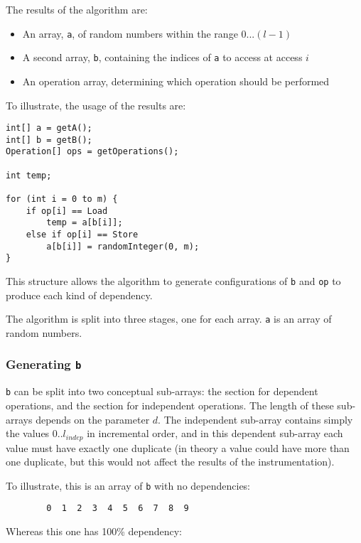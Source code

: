 	The results of the algorithm are:
	
	\begin{itemize}
		\item An array, \texttt{a}, of random numbers within the range $0...(l - 1)$
		\item A second array, \texttt{b}, containing the indices of \texttt{a} to access at access $i$
		\item An operation array, determining which operation should be performed
	\end{itemize}
	
	To illustrate, the usage of the results are:
	
	\begin{lstlisting}
int[] a = getA();
int[] b = getB();
Operation[] ops = getOperations();

int temp;

for (int i = 0 to m) {
    if op[i] == Load
        temp = a[b[i]];
    else if op[i] == Store
        a[b[i]] = randomInteger(0, m);
}\end{lstlisting}

	This structure allows the algorithm to generate configurations of \texttt{b} and \texttt{op} to produce each kind of dependency.
	
	The algorithm is split into three stages, one for each array. \texttt{a} is an array of random numbers.
	
		\subsubsection{Generating \texttt{b}} \label{sec:methodology/params/algo/gen-b}
		\texttt{b} can be split into two conceptual sub-arrays: the section for dependent operations, and the section for independent operations. The length of these sub-arrays depends on the parameter $d$. The independent sub-array contains simply the values $0..l_{indep}$ in incremental order, and in this dependent sub-array each value must have exactly one duplicate (in theory a value could have more than one duplicate, but this would not affect the results of the instrumentation).
		
		To illustrate, this is an array of \texttt{b} with no dependencies:
		
		\begin{verbatim}
		0  1  2  3  4  5  6  7  8  9
		\end{verbatim}
		
		Whereas this one has 100\% dependency:
		
